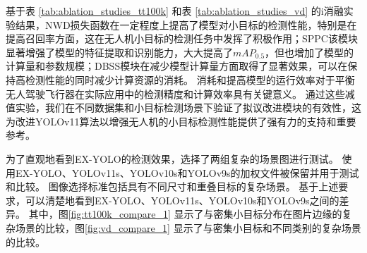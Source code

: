 基于表 \ref{tab:ablation_studies_tt100k} 和表 \ref{tab:ablation_studies_vd} 的i消融实验结果，NWD损失函数在一定程度上提高了模型对小目标的检测性能，特别是在提高召回率方面，这在无人机小目标的检测任务中发挥了积极作用；SPPC该模块显著增强了模型的特征提取和识别能力，大大提高了$mAP_{0.5}$，但也增加了模型的计算量和参数规模；DBSS模块在减少模型计算量方面取得了显著效果，可以在保持高检测性能的同时减少计算资源的消耗。 消耗和提高模型的运行效率对于平衡无人驾驶飞行器在实际应用中的检测精度和计算效率具有关键意义。 通过这些减值实验，我们在不同数据集和小目标检测场景下验证了拟议改进模块的有效性，这为改进YOLOv11算法以增强无人机的小目标检测性能提供了强有力的支持和重要参考。

为了直观地看到EX-YOLO的检测效果，选择了两组复杂的场景图进行测试。 使用EX-YOLO、YOLOv11s、YOLOv10s和YOLOv9s的加权文件被保留并用于测试和比较。 图像选择标准包括具有不同尺寸和重叠目标的复杂场景。 基于上述要求，可以清楚地看到EX-YOLO、YOLOv11s、YOLOv10s和YOLOv9s之间的差异。 其中，图\ref{fig:tt100k_compare_1}
显示了与密集小目标分布在图片边缘的复杂场景的比较，图\ref{fig:vd_compare_1}
显示了与密集小目标和不同类别的复杂场景的比较。

